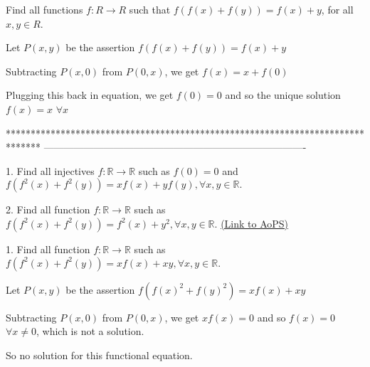 \begin{solution}
	\begin{tcolorbox}Find all functions $f:R \to R$ such that  $f(f(x)+f(y))=f(x)+y$, for all $x,y\in R$.\end{tcolorbox}
Let $P(x,y)$ be the assertion $f(f(x)+f(y))=f(x)+y$

Subtracting $P(x,0)$ from $P(0,x)$, we get $f(x)=x+f(0)$

Plugging this back in equation, we get $f(0)=0$ and so the unique solution $\boxed{f(x)=x}$ $\forall x$
\end{solution}
*******************************************************************************
-------------------------------------------------------------------------------

\begin{problem}
	1. Find all injectives $f:\mathbb{R}\to \mathbb{R}$ such as $f(0)=0$ and $f\left( {{f}^{2}}\left( x \right)+{{f}^{2}}\left( y \right) \right)=xf\left( x \right)+yf\left( y \right),\forall x,y\in \mathbb{R}.$

2. Find all function $f:\mathbb{R}\to \mathbb{R}$ such as $f\left( {{f}^{2}}\left( x \right)+{{f}^{2}}\left( y \right) \right)={{f}^{2}}\left( x \right)+{{y}^{2}},\forall x,y\in \mathbb{R}.$
	\flushright \href{https://artofproblemsolving.com/community/c6h565665}{(Link to AoPS)}
\end{problem}



\begin{solution}
	\begin{tcolorbox}1. Find all function $f:\mathbb{R}\to \mathbb{R}$ such as $f\left( {{f}^{2}}\left( x \right)+{{f}^{2}}\left( y \right) \right)=xf\left( x \right)+xy,\forall x,y\in \mathbb{R}.$\end{tcolorbox}
Let $P(x,y)$ be the assertion $f(f(x)^2+f(y)^2)=xf(x)+xy$ 

Subtracting $P(x,0)$ from $P(0,x)$, we get $xf(x)=0$ and so $f(x)=0$ $\forall x\ne 0$, which is not a solution.

So no solution for this functional equation.
\end{solution}



